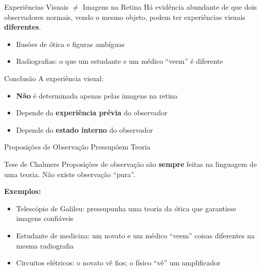 \documentclass[aspectratio=169]{beamer}
\newcommand{\impt}[1]{\textcolor{maccent}{\textbf{#1}}}
\newcommand{\ntc}[1]{\textcolor{mprimary}{#1}}
\begin{document}
\begin{frame}{Experiências Visuais $\neq$ Imagens na Retina}
  Há evidência abundante de que dois observadores normais, vendo o mesmo objeto, podem ter experiências visuais \impt{diferentes}.

  \vspace{0.3cm}
  \begin{itemize}
    \item Ilusões de ótica e figuras ambíguas
    \item Radiografias: o que um estudante e um médico ``veem'' é diferente
  \end{itemize}

  \vspace{0.3cm}
  \pause
  \begin{block}{Conclusão}
    A experiência visual:
    \begin{itemize}
      \item \impt{Não} é determinada apenas pelas imagens na retina
      \item Depende da \textbf{experiência prévia} do observador
      \item Depende do \textbf{estado interno} do observador
    \end{itemize}
  \end{block}
\end{frame}

\begin{frame}{Proposições de Observação Pressupõem Teoria}
  \begin{block}{Tese de Chalmers}
    Proposições de observação são \impt{sempre} feitas na linguagem de uma teoria. Não existe observação ``pura''.
  \end{block}

  \vspace{0.3cm}
  \pause
  \textbf{Exemplos:}
  \begin{itemize}
    \item \ntc{Telescópio de Galileu:} pressupunha uma teoria da ótica que garantisse imagens confiáveis
    \pause
    \item \ntc{Estudante de medicina:} um novato e um médico ``veem'' coisas diferentes na mesma radiografia
    \pause
    \item \ntc{Circuitos elétricos:} o novato vê fios; o físico ``vê'' um amplificador
  \end{itemize}
\end{frame}
\end{document}
